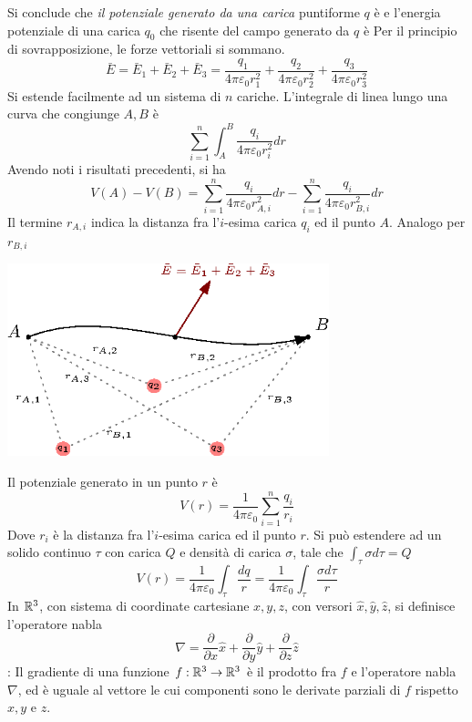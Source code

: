 \documentclass[10pt, letterpaper]{report}
\begin{document}
Si conclude che \textit{il potenziale generato da una carica} puntiforme $q$ è 
e l'energia potenziale di una carica $q_0$ che risente del campo generato da $q$ è 
Per il principio di sovrapposizione, le forze vettoriali si sommano. 
$$ \bar E = \bar E_1+\bar E_2 +\bar E_3 =\frac{q_1}{4\pi\varepsilon_0r_1^2}+ 
\frac{q_2}{4\pi\varepsilon_0r_2^2} + 
\frac{q_3}{4\pi\varepsilon_0r_3^2}$$
Si estende facilmente ad un sistema di $n$ cariche. L'integrale di linea lungo una curva che congiunge $A,B$ è 
$$\sum_{i=1}^n\int_A^B  \frac{q_i}{4\pi\varepsilon_0r_i^2}dr$$ 
Avendo noti i risultati precedenti, si ha  
$$ V(A)-V(B)=\sum_{i=1}^n \frac{q_i}{4\pi\varepsilon_0r_{A,i}^2}dr-\sum_{i=1}^n \frac{q_i}{4\pi\varepsilon_0r_{B,i}^2}dr$$
Il termine $r_{A,i}$ indica la distanza fra l'$i$-esima carica $q_i$ ed il punto $A$. Analogo per $r_{B,i}$
\begin{center}
    \includegraphics[width=0.7\textwidth]{images/sistemaCariche.eps}
\end{center}
Il potenziale generato in un punto $r$ è 
$$ V(r)=\frac{1}{4\pi\varepsilon_0}\sum_{i=1}^n\frac{q_i}{r_i}$$
Dove $r_i$ è la distanza fra l'$i$-esima carica ed il punto $r$. Si può estendere ad un solido continuo $\tau$ con carica $Q$ e  densità di carica $\sigma$, tale che $\int_{\tau}\sigma d\tau=Q$
$$ V(r)=\frac{1}{4\pi\varepsilon_0}\int_{\tau}\frac{dq}{r}=\frac{1}{4\pi\varepsilon_0}\int_{\tau}\frac{\sigma d\tau}{r}$$
 In ${\mathbb R}^3$, con sistema di coordinate cartesiane $x,y,z$, con versori  $\hat x,\hat y,\hat z$, si definisce l'operatore nabla 
$$ \nabla = \dfrac{\partial}{\partial x}\hat x+\dfrac{\partial}{\partial y}\hat y+\dfrac{\partial}{\partial z}\hat z$$
 : Il gradiente di una funzione $f:{\mathbb R}^3\rightarrow {\mathbb R}^3$ è il prodotto fra $f$ e l'operatore nabla $\nabla$, ed è uguale al vettore le cui componenti sono le derivate parziali di $f$ rispetto $x,y$ e $z$. 
\end{document}
